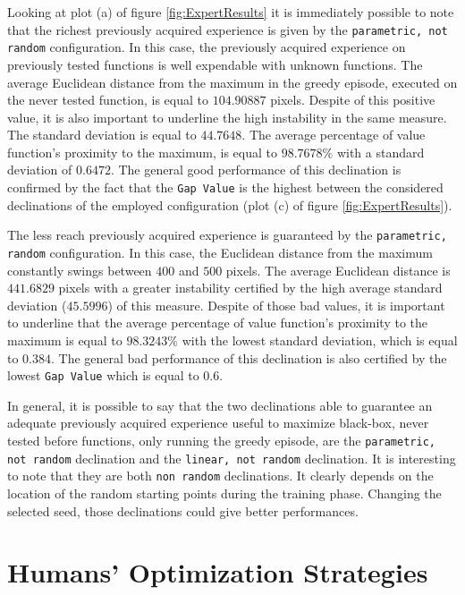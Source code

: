 Looking at plot (a) of figure \ref{fig:ExpertResults} it is immediately possible to note that the richest previously acquired experience is given by the {\tt parametric, not random} configuration. In this case, the previously acquired experience on previously tested functions is well expendable with unknown functions. The average Euclidean distance from the maximum in the greedy episode, executed on the never tested function, is equal to $104.90887$ pixels. Despite of this positive value, it is also important to underline the high instability in the same measure. The standard deviation is equal to $44.7648$. The average percentage of value function's proximity to the maximum, is  equal to $98.7678\%$ with a standard deviation of $0.6472$. The general good performance of this declination is confirmed by the fact that the {\tt Gap Value} is the highest between the considered declinations of the employed configuration (plot (c) of figure \ref{fig:ExpertResults}). 

The less reach previously acquired experience is guaranteed by the {\tt parametric, random} configuration. In this case, the Euclidean distance from the maximum constantly swings between $400$ and $500$ pixels. The average Euclidean distance is $441.6829$ pixels with a greater instability certified by the high average standard deviation ($45.5996$) of this measure. Despite of those bad values, it is important to underline that the average percentage of value function's proximity to the maximum is equal to $98.3243\%$ with the lowest standard deviation, which is equal to $0.384$. The general bad performance of this declination is also certified by the lowest {\tt Gap Value} which is equal to $0.6$.

In general, it is possible to say that the two declinations able to guarantee an adequate previously acquired experience useful to maximize black-box, never tested before functions, only running the greedy episode, are the {\tt parametric, not random} declination and the {\tt linear, not random} declination. It is interesting to note that they are both {\tt non random} declinations. It clearly depends on the location of the random starting points during the training phase. Changing the selected seed, those declinations could give better performances.

\section{Humans' Optimization Strategies}


